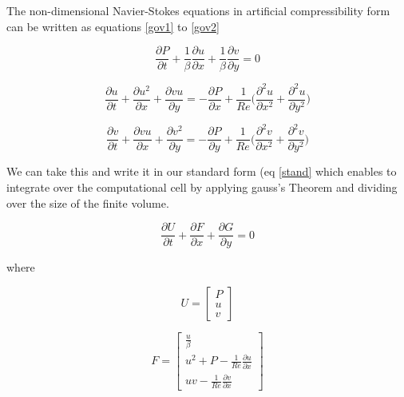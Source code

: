 \documentclass[paper=a4, fontsize=11pt, abstract=on]{scrartcl}
\numberwithin{equation}{section}		%
\numberwithin{figure}{section}			%
\numberwithin{table}{section}				%
\begin{document}
The non-dimensional Navier-Stokes equations in
artificial compressibility form can be written as equations \ref{gov1} to \ref{gov2}

\begin{equation}
\label{gov1}
\frac{\partial P}{\partial t}+\frac{1}{\beta}\frac{\partial u}{\partial x}+\frac{1}{\beta}\frac{\partial v}{\partial y} = 0
\end{equation} 

 \begin{equation}
\label{nav}
\frac{\partial u}{\partial t} +\frac{\partial u^2}{\partial x}+\frac{\partial vu}{\partial y} = -\frac{\partial P}{\partial x} + \frac{1}{Re} \Bigg(  \frac{\partial^2 u}{\partial x^2} + \frac{\partial^2 u}{\partial y^2} \Bigg)
\end{equation} 

 \begin{equation}
\label{gov2}
\frac{\partial v}{\partial t} +\frac{\partial vu}{\partial x}+\frac{\partial v^2}{\partial y} = -\frac{\partial P}{\partial y} + \frac{1}{Re} \Bigg(  \frac{\partial^2 v}{\partial x^2} + \frac{\partial^2 v}{\partial y^2} \Bigg)
\end{equation} 

We can take this and write it in our standard form (eq \ref{stand} which enables to integrate over the computational cell by applying gauss's Theorem and dividing over the size of the finite volume.

 \begin{equation}
\label{stand}
\frac{\partial U}{\partial t} + \frac{\partial F}{\partial x} + \frac{\partial G}{\partial y} = 0
\end{equation} 

where

\begin{equation}
\label{nav2}
U= \begin{bmatrix}
   P    \\
   u  \\
    v
\end{bmatrix}
\end{equation} 

\begin{equation}
\label{nav3}
F= \begin{bmatrix}
    \frac{u}{\beta}    \\
   u^2+P-\frac{1}{Re}\frac{\partial u}{\partial x}  \\
    uv-\frac{1}{Re}\frac{\partial v}{\partial x}
\end{bmatrix}
\end{equation} 
\end{document}
